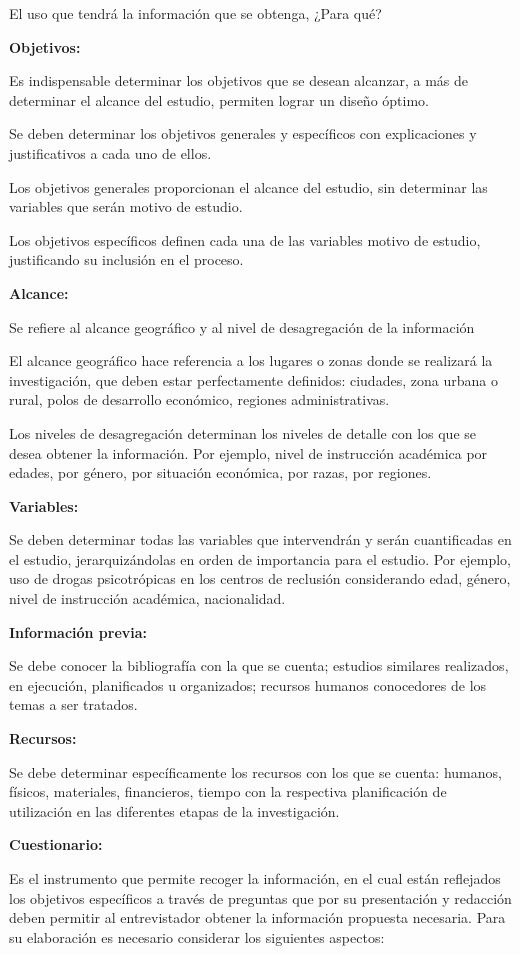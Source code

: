 \documentclass[a5paper,doc,10pt,noapacite]{apa6}
\newcommand{\neodefi}[1]{%
	\vspace{1\baselineskip}
	\textbf{\small#1} \newline
}
\begin{document}
{{El uso que tendrá la información que se obtenga, ¿Para qué?
	
\neodefi{Objetivos:}
	Es indispensable determinar los objetivos que se desean alcanzar, a más de determinar el alcance del estudio, permiten lograr un diseño óptimo.
	
	Se deben determinar los objetivos generales y específicos con explicaciones y justificativos a cada uno de ellos.
	
	Los objetivos generales proporcionan el alcance del estudio, sin determinar las variables que serán motivo de estudio.
	
	Los objetivos específicos definen cada una de las variables motivo de estudio, justificando su inclusión en el proceso.
	
\neodefi{Alcance:}
	Se refiere al alcance geográfico y al nivel de desagregación de la información
	
	El alcance geográfico hace referencia a los lugares o zonas donde se realizará la investigación, que deben estar perfectamente definidos: ciudades, zona urbana o rural, polos de desarrollo económico, regiones administrativas.
	
	Los niveles de desagregación determinan los niveles de detalle con los que se desea obtener la información. Por ejemplo, nivel de instrucción académica por edades, por género, por situación económica, por razas, por regiones.

\neodefi{Variables:}
	Se deben determinar todas las variables que intervendrán y serán cuantificadas en el estudio, jerarquizándolas en orden de importancia para el estudio. Por ejemplo, uso de drogas psicotrópicas en los centros de reclusión considerando edad, género, nivel de instrucción académica, nacionalidad.

\neodefi{Información previa:}
	Se debe conocer la bibliografía con la que se cuenta; estudios similares realizados, en ejecución, planificados u organizados; recursos humanos conocedores de los temas a ser tratados.

\neodefi{Recursos:}
	Se debe determinar específicamente los recursos con los que se cuenta: humanos, físicos, materiales, financieros, tiempo con la respectiva planificación de utilización en las diferentes etapas de la investigación.
	
\neodefi{Cuestionario:}
	Es el instrumento que permite recoger la información, en el cual están reflejados los objetivos específicos a través de preguntas que por su presentación y redacción deben permitir al entrevistador obtener la información propuesta necesaria. Para su elaboración es necesario considerar los siguientes aspectos:
	
}}
\end{document}

